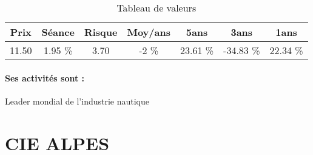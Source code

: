 \documentclass[11pt,a4paper]{report}%
\begin{document}
\begin{table}[H]
  \centering
    \begin{tabular}{|c|c|c|c|c|c|c|}
    \hline
    Prix & Séance & Risque  & Moy/ans & 5ans & 3ans & 1ans \\
    \hline
    11.50 &    1.95 \%    & 3.70 & -2 \% & 23.61 \% & -34.83 \% & 22.34 \% \\
    \hline
    \end{tabular}%
        \label{tab:table_BENETEAU}%
      \caption{Tableau de valeurs}
\end{table}%

\paragraph{Ses activités sont : } Leader mondial de l’industrie nautique 
    
    \newpage

\section{CIE ALPES}
\end{document}
